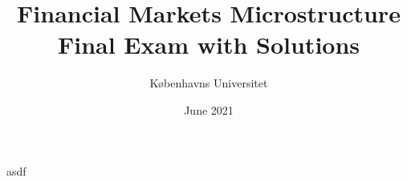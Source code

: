\documentclass[11pt
]{exam}
\begin{document}
	
	\title{Financial Markets Microstructure\\
		Final Exam with Solutions}
	\author{K{\o}benhavns Universitet}
	\date{June 2021}
	\maketitle
	asdf
	
	
	
\end{document}
